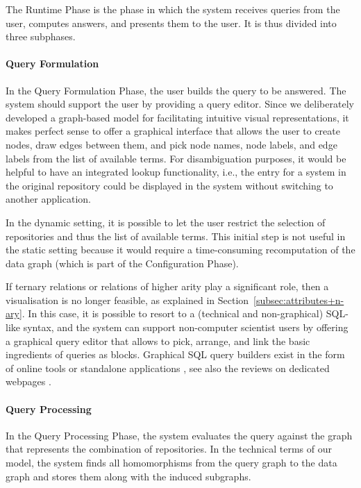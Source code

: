 The Runtime Phase is the phase in which the system receives queries from the user,
computes answers, and presents them to the user. It is thus divided into
three subphases.

\paragraph{Query Formulation}

In the Query Formulation Phase, the user builds the query
to be answered. The system should support the user by providing a query editor.
Since we deliberately developed a graph-based model
for facilitating intuitive visual representations,
it makes perfect sense to offer a graphical interface
that allows the user to create nodes, draw edges between them,
and pick node names, node labels, and edge labels from the list of available terms.
For disambiguation purposes, it would be helpful to have an
integrated lookup functionality, i.e., the entry for a system
in the original repository could be displayed in the system
without switching to another application.

In the dynamic setting, it is possible to let the user
restrict the selection of repositories and thus the list of available terms.
This initial step is not useful in the static setting
because it would require a time-consuming recomputation
of the data graph (which is part of the Configuration Phase).

If ternary relations or relations of higher arity play a significant role,
then a visualisation is no longer feasible, as explained in Section~\ref{subsec:attributes+n-ary}.
In this case, it is possible to resort to a (technical and non-graphical)
SQL-like syntax, and the system can support non-computer scientist users by 
offering a graphical query editor that allows to pick, arrange, and link
the basic ingredients of queries as blocks.
Graphical SQL query builders exist in the form of online tools or standalone applications
\autocite[e.g.,][]{VisualSQL,SQLeo}, see also the reviews on dedicated webpages
\autocite[e.g.,][]{ChartioVisualSQL,FinOnlBestVisualQueryBuilders}.

\paragraph{Query Processing}

In the Query Processing Phase, the system evaluates the query against the
graph that represents the combination of repositories.
In the technical terms of our model, the system finds all homomorphisms from the query graph
to the data graph and stores them along with the induced subgraphs.

